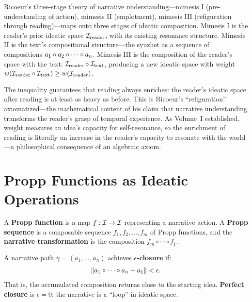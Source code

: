 \begin{remark}
\label{rem:triple-mimesis}
Ricoeur's three-stage theory of narrative understanding---mimesis I (pre-understanding of action), mimesis II (emplotment), mimesis III (refiguration through reading)---maps onto three stages of ideatic composition.  Mimesis I is the reader's prior ideatic space $\mathcal{I}_{\text{reader}}$, with its existing resonance structure.  Mimesis II is the text's compositional structure---the syuzhet as a sequence of compositions $a_1 \circ a_2 \circ \cdots \circ a_n$.  Mimesis III is the composition of the reader's space with the text: $\mathcal{I}_{\text{reader}} \circ \mathcal{I}_{\text{text}}$, producing a new ideatic space with weight $w(\mathcal{I}_{\text{reader}} \circ \mathcal{I}_{\text{text}}) \geq w(\mathcal{I}_{\text{reader}})$.

The inequality guarantees that reading always enriches: the reader's ideatic space after reading is at least as heavy as before.  This is Ricoeur's ``refiguration'' axiomatized---the mathematical content of his claim that narrative understanding transforms the reader's grasp of temporal experience.  As Volume~I established, weight measures an idea's capacity for self-resonance, so the enrichment of reading is literally an increase in the reader's capacity to resonate with the world---a philosophical consequence of an algebraic axiom.
\end{remark}


\section{Propp Functions as Ideatic Operations}

\begin{definition}
\label{def:propp-function}
A \textbf{Propp function} is a map $f: \mathcal{I} \to \mathcal{I}$ representing a
narrative action.  A \textbf{Propp sequence} is a composable sequence
$f_1, f_2, \ldots, f_m$ of Propp functions, and the \textbf{narrative
transformation} is the composition $f_m \circ \cdots \circ f_1$.
\end{definition}

\begin{definition}
\label{def:narrative-closure}
A narrative path $\gamma = (a_1, \ldots, a_n)$ achieves \textbf{$\epsilon$-closure}
if:
\[
  \|a_1 \circ \cdots \circ a_n - a_1\| < \epsilon.
\]
That is, the accumulated composition returns close to the starting idea.
\textbf{Perfect closure} is $\epsilon = 0$: the narrative is a ``loop'' in
ideatic space.
\end{definition}

